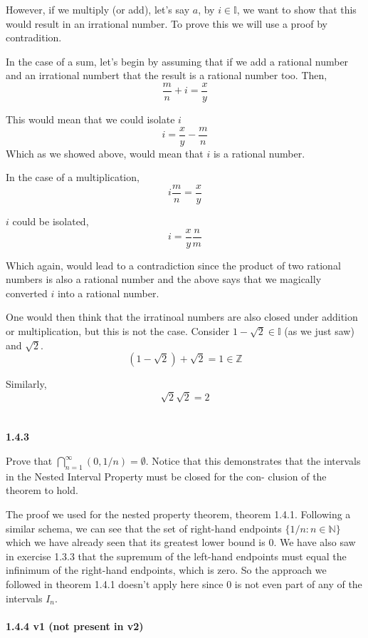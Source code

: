 However, if we multiply (or add), let's say $a$, by $i \in \mathbb{I}$, we want to show that this would result in an irrational number.
To prove this we will use a proof by contradition.

In the case of a sum, let's begin by assuming that if we add a rational number and an irrational numbert
that the result is a rational number too.
Then,
$$
\frac{m}{n} + i = \frac{x}{y}
$$

This would mean that we could isolate $i$
$$
i = \frac{x}{y} - \frac{m}{n}
$$
Which as we showed above, would mean that $i$ is a rational number.

In the case of a multiplication,
$$
i \frac{m}{n} = \frac{x}{y}
$$

$i$ could be isolated,
$$
i = \frac{x}{y} \frac{n}{m}
$$

Which again, would lead to a contradiction since the product of two rational numbers is also a rational number
and the above says that we magically converted $i$ into a rational number.

One would then think that the irratinoal numbers are also closed under addition or multiplication, but this is not the case.
Consider $1 - \sqrt{2} \in \mathbb{I}$ (as we just saw) and $\sqrt{2}$.
$$
( 1 - \sqrt{2} ) + \sqrt{2} = 1 \in \mathbb{Z}
$$

Similarly,
$$
\sqrt{2}\sqrt{2} = 2
$$
\\~\\

\label{abbott:1.4.3}
\textbf{1.4.3}

Prove that $\bigcap^{\infty}_{n=1} (0, 1/n) = \emptyset$. 
Notice that this demonstrates that the intervals in the Nested Interval Property
must be closed for the con- clusion of the theorem to hold.

The proof we used for the nested property theorem, theorem 1.4.1.
Following a similar schema, we can see that the set of right-hand endpoints $\{ 1/n : n\in\mathbb{N} \}$ which we have
already seen that its greatest lower bound is 0.
We have also saw in exercise 1.3.3 that the supremum of the left-hand endpoints must equal the infinimum of the right-hand
endpoints, which is zero.
So the approach we followed in theorem 1.4.1 doesn't apply here since 0 is not even part of any of the intervals $I_n$.
\\~\\


\textbf{1.4.4 v1 (not present in v2)}

